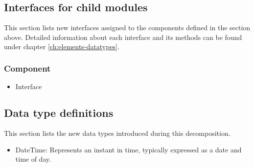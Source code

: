 \subsection{Interfaces for child modules}
    This section lists new interfaces assigned to the components defined
    in the section above. Detailed information about each interface and
    its methods can be found under chapter \ref{ch:elements-datatypes}. \\

    \subsubsection{Component}
        \begin{itemize}
            \item Interface
        \end{itemize}

\subsection{Data type definitions}
    This section lists the new data types introduced during this decomposition.

    \begin{itemize}
        \item DateTime: Represents an instant in time, typically expressed as a date and time of day.
    \end{itemize}
